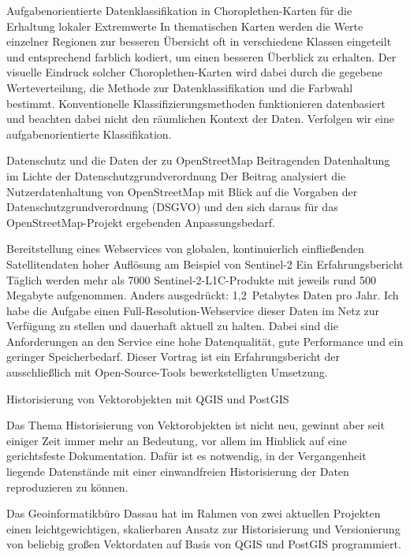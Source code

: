 %
{Aufgabenorientierte Datenklassifikation in Choroplethen-Karten für die Erhaltung lokaler Extremwerte}%
{}%
{%
In thematischen Karten werden die Werte einzelner Regionen zur besseren
Übersicht oft in verschiedene Klassen eingeteilt und entsprechend farblich
kodiert, um einen besseren Überblick zu erhalten. Der visuelle Eindruck solcher
Choroplethen-Karten wird dabei durch die gegebene Werteverteilung, die Methode
zur Datenklassifikation und die Farbwahl bestimmt. Konventionelle
Klassifizierungsmethoden funktionieren datenbasiert und beachten dabei nicht
den räumlichen Kontext der Daten. Verfolgen wir eine aufgabenorientierte
Klassifikation.%
}



%
{Datenschutz und die Daten der zu OpenStreetMap Beitragenden}%
{Datenhaltung im Lichte der Datenschutzgrundverordnung}%
{%
Der Beitrag analysiert die Nutzerdatenhaltung von OpenStreetMap mit Blick auf
die Vorgaben der Datenschutzgrundverordnung (DSGVO) und den sich daraus für das
OpenStreetMap-Projekt ergebenden Anpassungsbedarf.%
}

%
{Bereitstellung eines Webservices von globalen, kontinuierlich einfließenden Satellitendaten hoher Auflösung am Beispiel von Sentinel-2}%
{Ein Erfahrungsbericht}%
{%
Täglich werden mehr als 7000 Sentinel-2-L1C-Produkte mit jeweils rund 500
Megabyte aufgenommen. Anders ausgedrückt: 1,2~Petabytes Daten pro Jahr. Ich
habe die Aufgabe einen Full-Resolution-Webservice dieser Daten im Netz zur
Verfügung zu stellen und dauerhaft aktuell zu halten. Dabei sind die
Anforderungen an den Service eine hohe Datenqualität, gute Performance und ein
geringer Speicherbedarf. Dieser Vortrag ist ein Erfahrungsbericht der
ausschließlich mit Open-Source-Tools bewerkstelligten Umsetzung.%
}



%
{Historisierung von Vektorobjekten mit QGIS und PostGIS}%
{}%
{%
Das Thema Historisierung von Vektorobjekten ist nicht neu, gewinnt aber seit
einiger Zeit immer mehr an Bedeutung, vor allem im Hinblick auf eine
gerichtsfeste Dokumentation. Dafür ist es notwendig, in der Vergangenheit
liegende Datenstände mit einer einwandfreien Historisierung der Daten
reproduzieren zu können.

Das Geoinformatikbüro Dassau hat im Rahmen von zwei aktuellen Projekten einen
leichtgewichtigen, skalierbaren Ansatz zur Historisierung und Versionierung von
beliebig großen Vektordaten auf Basis von QGIS und PostGIS programmiert.%
}

